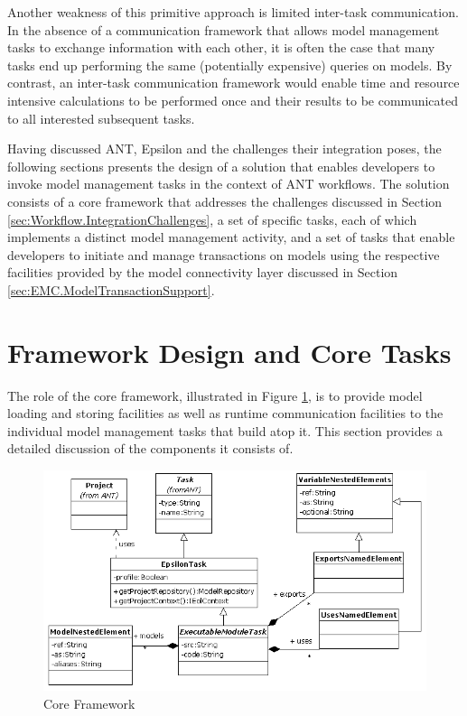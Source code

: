Another weakness of this primitive approach is limited inter-task communication. In the absence of a communication framework that allows model management tasks to exchange information with each other, it is often the case that many tasks end up performing the same (potentially expensive) queries on models. By contrast, an inter-task communication framework would enable time and resource intensive calculations to be performed once and their results to be communicated to all interested subsequent tasks.

Having discussed ANT, Epsilon and the challenges their integration poses, the following sections presents the design of a solution that enables developers to invoke model management tasks in the context of ANT workflows. The solution consists of a core framework that addresses the challenges discussed in Section \ref{sec:Workflow.IntegrationChallenges}, a set of specific tasks, each of which implements a distinct model management activity, and a set of tasks that enable developers to initiate and manage transactions on models using the respective facilities provided by the model connectivity layer discussed in Section \ref{sec:EMC.ModelTransactionSupport}. 

\section{Framework Design and Core Tasks}
\label{sec:Workflow.Framework}

The role of the core framework, illustrated in Figure \ref{fig:Core}, is to provide model loading and storing facilities as well as runtime communication facilities to the individual model management tasks that build atop it. This section provides a detailed discussion of the components it consists of.

\begin{landscape}
\begin{figure}
	\centering
		\includegraphics{images/AntEpsilon.png}
	\caption{Core Framework}
	\label{fig:Core}
\end{figure}
\end{landscape}

